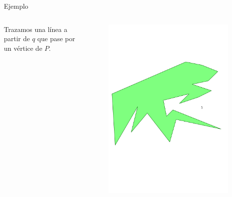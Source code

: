 \documentclass[aspectratio=169,xcolor=dvipsnames, t]{beamer}
\begin{document}
\begin{frame}{Ejemplo}
  \begin{columns}
    \begin{column}{0.3\textwidth}
      \raggedright %
      Trazamos una línea a partir de $q$ que pase por un vértice de $P$.
    \end{column}
    \begin{column}{0.7\textwidth}
      \vspace{-1.5cm} %
      \begin{figure}
        \centering
        \includegraphics[width=1\linewidth, height=.85\textheight, page=3, keepaspectratio]{IPE/point_visibility.pdf}
      \end{figure}
    \end{column}
  \end{columns}
\end{frame}
\end{document}
